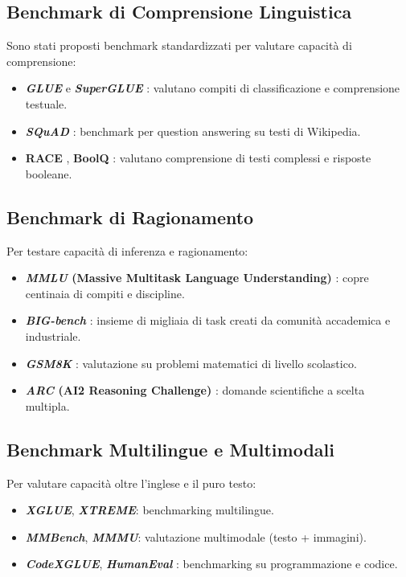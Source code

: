 \subsection{Benchmark di Comprensione Linguistica}
Sono stati proposti benchmark standardizzati per valutare capacità di comprensione:
\begin{itemize}
    \item \textbf{\textit{GLUE}} \cite{wang2018glue} e \textbf{\textit{SuperGLUE}} \cite{wang2019superglue}: valutano compiti di classificazione e comprensione testuale.
    \item \textbf{\textit{SQuAD}} \cite{rajpurkar2016squad}: benchmark per question answering su testi di Wikipedia.
    \item \textbf{RACE} \cite{lai2017race}, \textbf{BoolQ} \cite{clark2019boolq}: valutano comprensione di testi complessi e risposte booleane.
\end{itemize}

\subsection{Benchmark di Ragionamento}
Per testare capacità di inferenza e ragionamento:
\begin{itemize}
    \item \textbf{\textit{MMLU} (Massive Multitask Language Understanding)} \cite{hendrycks2020measuring}: copre centinaia di compiti e discipline.
    \item \textbf{\textit{BIG-bench}} \cite{srivastava2022beyond}: insieme di migliaia di task creati da comunità accademica e industriale.
    \item \textbf{\textit{GSM8K}} \cite{cobbe2021training}: valutazione su problemi matematici di livello scolastico.
    \item \textbf{\textit{ARC} (AI2 Reasoning Challenge)} \cite{clark2018arc}: domande scientifiche a scelta multipla.
\end{itemize}

\subsection{Benchmark Multilingue e Multimodali}
Per valutare capacità oltre l'inglese e il puro testo:
\begin{itemize}
    \item \textbf{\textit{XGLUE}}, \textbf{\textit{XTREME}}: benchmarking multilingue.
    \item \textbf{\textit{MMBench}}, \textbf{\textit{MMMU}}: valutazione multimodale (testo + immagini).
    \item \textbf{\textit{CodeXGLUE}}, \textbf{\textit{HumanEval}} \cite{chen2021evaluating}: benchmarking su programmazione e codice.
\end{itemize}

